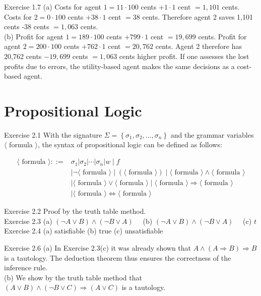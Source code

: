 \documentclass[10pt]{book}
\begin{document}
Exercise 1.7
(a) Costs for agent $1=11 \cdot 100$ cents $+1 \cdot 1$ cent $=1,101$ cents. Costs for $2=0 \cdot 100$ cents $+38 \cdot 1$ cent $=38$ cents. Therefore agent 2 saves 1,101 cents -38 cents $=1,063$ cents.\\
(b) Profit for agent $1=189 \cdot 100$ cents $+799 \cdot 1$ cent $=19,699$ cents. Profit for agent $2=200 \cdot 100$ cents $+762 \cdot 1$ cent $=20,762$ cents. Agent 2 therefore has 20,762 cents $-19,699$ cents $=1,063$ cents higher profit. If one assesses the lost profits due to errors, the utility-based agent makes the same decisions as a cost-based agent.

\section{Propositional Logic}
Exercise 2.1 With the signature $\Sigma=\left\{\sigma_{1}, \sigma_{2}, \ldots, \sigma_{n}\right\}$ and the grammar variables $\langle$ formula $\rangle$, the syntax of propositional logic can be defined as follows:

$$
\begin{aligned}
\langle\text { formula }\rangle::= & \sigma_{1}\left|\sigma_{2}\right| \cdots\left|\sigma_{n}\right| w \mid f \\
& \mid \neg\langle\text { formula }\rangle \mid(\langle\text { formula }\rangle) \mid\langle\text { formula }\rangle \wedge\langle\text { formula }\rangle \\
& \mid\langle\text { formula }\rangle \vee\langle\text { formula }\rangle \mid\langle\text { formula }\rangle \Rightarrow\langle\text { formula }\rangle \\
& \mid\langle\text { formula }\rangle \Leftrightarrow\langle\text { formula }\rangle
\end{aligned}
$$

Exercise 2.2 Proof by the truth table method.\\
Exercise 2.3 (a) $(\neg A \vee B) \wedge(\neg B \vee A) \quad$ (b) $(\neg A \vee B) \wedge(\neg B \vee A) \quad$ (c) $t$\\
Exercise 2.4 (a) satisfiable (b) true (c) unsatisfiable

Exercise 2.6
(a) In Exercise 2.3(c) it was already shown that $A \wedge(A \Rightarrow B) \Rightarrow B$ is a tautology. The deduction theorem thus ensures the correctness of the inference rule.\\
(b) We show by the truth table method that $(A \vee B) \wedge(\neg B \vee C) \Rightarrow(A \vee C)$ is a tautology.
\end{document}
